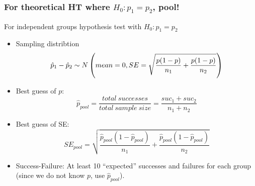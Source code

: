 \documentclass[slidestop,compress,mathserif,12pt,t,professionalfonts,xcolor=table]{beamer}
\begin{document}
\begin{frame}
\frametitle{For theoretical HT where $H_0: p_1 = p_2$, pool!}








For independent groups hypothesis test with $H_0: p_1 = p_2$

\begin{itemize}

\item Sampling distribtion
\[
\hat p_1 - \hat p_2 \sim N \left(  mean = 0, SE = \sqrt{ \frac{p(1-p)}{n_1} + \frac{p(1-p)}{n_2} }  \right)
\]

\pause

\item Best guess of $p$:
\[ \hat{p}_{pool} = \frac{total~successes}{total~sample~size} = \frac{suc_1 + suc_2}{n_1 + n_2} \]

\item Best guess of SE:
\[
SE_{pool} = \sqrt{ \frac{\hat p_{pool}(1-\hat p_{pool})}{n_1} + \frac{\hat p_{pool}(1-\hat p_{pool})}{n_2} } 
\]

\item Success-Failure: At least 10 ``expected'' successes and failures for each group (since we do not know $p$, use $\hat p_{pool}$).

\end{itemize}

\end{frame}

\end{document}

